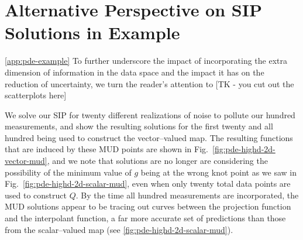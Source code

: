 \section{Alternative Perspective on SIP Solutions in Example}\ref{app:pde-example}
To further underscore the impact of incorporating the extra dimension of information in the data space and the impact it has on the reduction of uncertainty, we turn the reader's attention to
[TK - you cut out the scatterplots here]

We solve our SIP for twenty different realizations of noise to pollute our hundred measurements, and show the resulting solutions for the first twenty and all hundred being used to construct the vector--valued map.
The resulting functions that are induced by these MUD points are shown in Fig.~\ref{fig:pde-highd-2d-vector-mud}, and we note that solutions are no longer are considering the possibility of the minimum value of $g$ being at the wrong knot point as we saw in Fig.~\ref{fig:pde-highd-2d-scalar-mud}, even when only twenty total data points are used to construct $Q$.
By the time all hundred measurements are incorporated, the MUD solutions appear to be tracing out curves between the projection function and the interpolant function, a far more accurate set of predictions than those from the scalar--valued map (see \ref{fig:pde-highd-2d-scalar-mud}).

